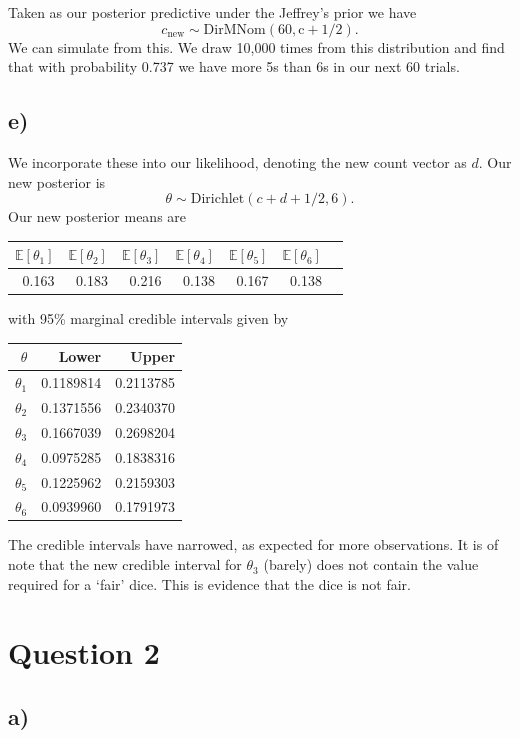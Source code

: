 \documentclass[10pt]{extarticle}
\newcommand{\E}{\mathbb{E}}
\begin{document}
Taken as our posterior predictive under the Jeffrey's prior we have $$c_{\text{new}}\sim \mathrm{DirMNom(60, c + 1/2)}.$$
We can simulate from this. We draw 10,000 times from this distribution and find that with probability 0.737 we have more 5s than 6s in our next 60 trials.

\subsection*{e)}
We incorporate these into our likelihood, denoting the new count vector as $d$. Our new posterior is $$\theta \sim \mathrm{Dirichlet}(c+d+1/2, 6).$$ Our new posterior means are 
\begin{table}[H]
	\centering
	\begin{tabular}{rrrrrrr}
		\hline
		$\E\left[\theta_1\right]$ & $\E\left[\theta_2\right]$ & $\E\left[\theta_3\right]$ & $\E\left[\theta_4\right]$ & $\E\left[\theta_5\right]$ & $\E\left[\theta_6\right]$ \\ 
		\hline
		0.163 &0.183 &0.216 &0.138 &0.167 &0.138 \\ 
		\hline
	\end{tabular}
\end{table}
with 95\% marginal credible intervals given by 
\begin{table}[H]
	\centering
	\begin{tabular}{r|rr}
		\hline
		$\theta$ & Lower & Upper\\
		\hline
		$\theta_1$ &0.1189814 &0.2113785\\
		$\theta_2$ &0.1371556 &0.2340370\\
		$\theta_3$ &0.1667039 &0.2698204\\
		$\theta_4$ &0.0975285 &0.1838316\\
		$\theta_5$ &0.1225962 &0.2159303\\
		$\theta_6$ &0.0939960 &0.1791973\\
	\end{tabular}
\end{table}
The credible intervals have narrowed, as expected for more observations. It is of note that the new credible interval for $\theta_3$ (barely) does not contain the value required for a `fair' dice. This is evidence that the dice is not fair. 

\section*{Question 2}

\subsection*{a)}
\end{document}
